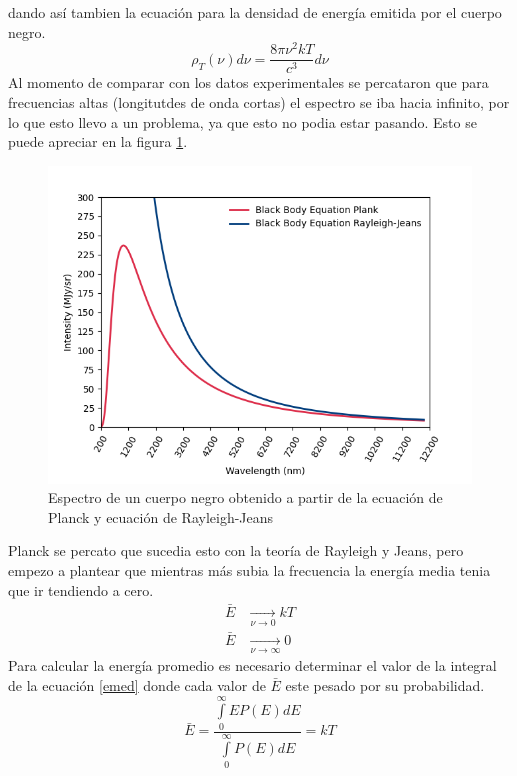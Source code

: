 \documentclass[12pt,letterpaper]{article}
\begin{document}
\begin{multicols}{2}
\begin{equation}
\end{equation}
dando así tambien la ecuación para la densidad de energía emitida por el cuerpo negro. 
\begin{equation}
\rho_T(\nu) d\nu = \frac{8\pi \nu^2 k T}{c^3} d\nu 
\end{equation}
Al momento de comparar con los datos experimentales se percataron que para frecuencias altas (longitutdes de onda cortas) el espectro se iba hacia infinito, por lo que esto llevo a un problema, ya que esto no podia estar pasando. Esto se puede apreciar en la figura \ref{teovsexp}.
\begin{figure}[H]
\includegraphics[scale=0.5]{../Graphics/exp_vs_teo.png}
\caption{Espectro de un cuerpo negro obtenido a partir de la ecuación de Planck y ecuación de Rayleigh-Jeans}
\label{teovsexp}
\end{figure}
Planck se percato que sucedia esto con la teoría de Rayleigh y Jeans, pero empezo a plantear que mientras más subia la frecuencia la energía media tenia que ir tendiendo a cero. 
\begin{align*}
\bar{E} &\xrightarrow[\nu \rightarrow 0]{} kT \\
\bar{E} &\xrightarrow[\nu \rightarrow \infty]{} 0 
\end{align*}
Para calcular la energía promedio es necesario determinar el valor de la integral de la ecuación \ref{emed} donde cada valor de $\bar{E}$ este pesado por su probabilidad.
\begin{equation}
\bar{E}= \frac{\int\limits_0^\infty EP(E)dE}{\int\limits_0^\infty P(E)dE} = kT
\label{emed}
\end{equation}

\end{multicols}
\end{document}
